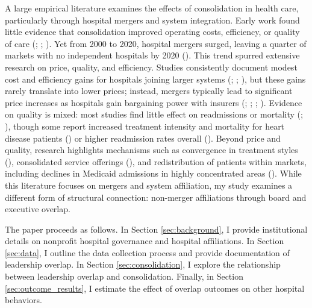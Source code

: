 \documentclass[12pt]{article}
\begin{document}
    A large empirical literature examines the effects of consolidation in health care, particularly through hospital mergers and system integration. Early work found little evidence that consolidation improved operating costs, efficiency, or quality of care (\cite{alexander1996short}; \cite{ho2000hospital}; \cite{dranove2003hospital}). Yet from 2000 to 2020, hospital mergers surged, leaving a quarter of markets with no independent hospitals by 2020 (\cite{ElevanceHealth2023}). This trend spurred extensive research on price, quality, and efficiency. Studies consistently document modest cost and efficiency gains for hospitals joining larger systems (\cite{schmitt2017hospital}; \cite{andreyeva2024corporatization}; \cite{craig2021mergers}), but these gains rarely translate into lower prices; instead, mergers typically lead to significant price increases as hospitals gain bargaining power with insurers (\cite{gaynor2012impact}; \cite{boozary2019association}; \cite{cooper2019price}; \cite{andreyeva2024corporatization}). Evidence on quality is mixed: most studies find little effect on readmissions or mortality (\cite{haas2011mergers}; \cite{beaulieu2020changes}), though some report increased treatment intensity and mortality for heart disease patients (\cite{hayford2012impact}) or higher readmission rates overall (\cite{andreyeva2024corporatization}). Beyond price and quality, research highlights mechanisms such as convergence in treatment styles (\cite{eliason2020acquisitions}), consolidated service offerings (\cite{mariani2022impact}), and redistribution of patients within markets, including declines in Medicaid admissions in highly concentrated areas (\cite{desai2023hospital}). While this literature focuses on mergers and system affiliation, my study examines a different form of structural connection: non-merger affiliations through board and executive overlap.

    The paper proceeds as follows. In Section \ref{sec:background}, I provide institutional details on nonprofit hospital governance and hospital affiliations. In Section \ref{sec:data}, I outline the data collection process and provide documentation of leadership overlap. In Section \ref{sec:consolidation}, I explore the relationship between leadership overlap and consolidation. Finally, in Section \ref{sec:outcome_results}, I estimate the effect of overlap outcomes on other hospital behaviors. 


    

    
\end{document}
